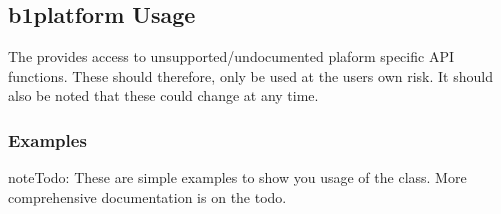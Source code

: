 \documentclass[letterpaper,10pt,english]{sphinxmanual}
\begin{document}
\subsection{b1platform Usage}
\label{\detokenize{b1platform-usage:b1platform-usage}}\label{\detokenize{b1platform-usage::doc}}
\sphinxAtStartPar
The  provides access to unsupported/undocumented plaform
specific API functions. These should therefore, only be used at the users
own risk. It should also be noted that these could change at any time.


\subsubsection{Examples}
\label{\detokenize{b1platform-usage:examples}}
\begin{sphinxadmonition}{note}{\label{\detokenize{b1platform-usage:id1}}Todo:}
\sphinxAtStartPar
These are simple examples to show you usage of the class. More comprehensive
documentation is on the todo.
\end{sphinxadmonition}
\end{document}

